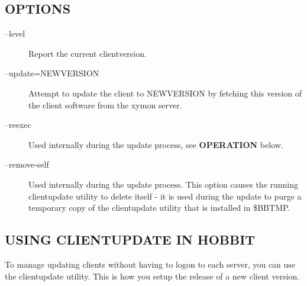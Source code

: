  
\subsection{OPTIONS}
\begin{description}
\item[--level] Report the current clientversion. 

 

\item[--update=NEWVERSION] Attempt to update the client to NEWVERSION by fetching this version of the client software from the xymon server. 

 

\item[--reexec] Used internally during the update process, see \textbf{OPERATION}
 below. 

 

\item[--remove-self] Used internally during the update process. This option causes the running clientupdate utility to delete itself - it is used during the update to purge a temporary copy of the clientupdate utility that is installed in \$BBTMP. 

 


\end{description}
\subsection{USING CLIENTUPDATE IN HOBBIT}
 To manage updating clients without having to logon to each server, you can use the clientupdate utility. This is how you setup the release of a new client version. 

